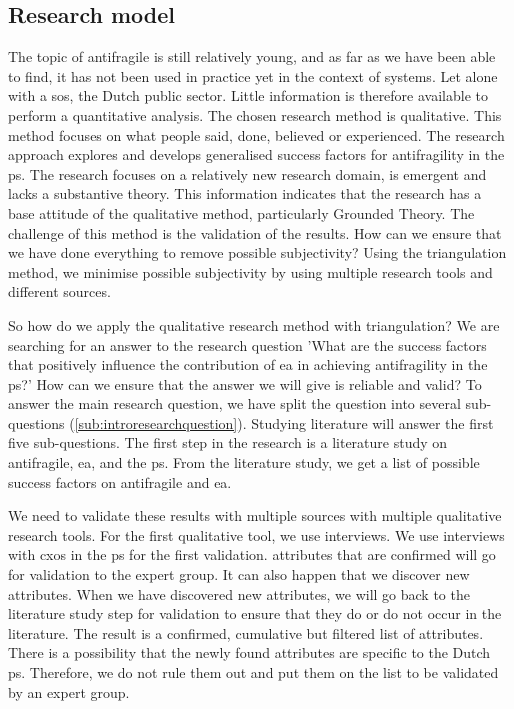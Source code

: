 \subsection{Research model}
\label{sec:researchmodel}
The topic of \gls{antifragile} is still relatively young, and as far as we have been able to find, it has not been used in practice yet in the context of systems. Let alone with a \gls{sos}, the Dutch public sector. Little information is therefore available to perform a quantitative analysis. The chosen research method is qualitative. This method focuses on what people said, done, believed or experienced. The research approach explores and develops generalised success factors for \gls{antifragility} in the \gls{ps}. The research focuses on a relatively new research domain, is emergent and lacks a substantive theory. This information indicates that the research has a base attitude of the qualitative method, particularly Grounded Theory. The challenge of this method is the validation of the results. How can we ensure that we have done everything to remove possible subjectivity? Using the triangulation method, we minimise possible subjectivity by using multiple research tools and different sources.

So how do we apply the qualitative research method with triangulation? We are searching for an answer to the research question 'What are the success factors that positively influence the contribution of \acrlong{ea} in achieving \gls{antifragility} in the \gls{ps}?' How can we ensure that the answer we will give is reliable and valid? To answer the main research question, we have split the question into several sub-questions (\cref{sub:introresearchquestion}). Studying literature will answer the first five sub-questions. The first step in the research is a literature study on \gls{antifragile}, \acrlong{ea}, and the \gls{ps}. From the literature study, we get a list of possible success factors on \gls{antifragile} and \acrlong{ea}.

We need to validate these results with multiple sources with multiple qualitative research tools. For the first qualitative tool, we use interviews. We use interviews with \glspl{cxo} in the \gls{ps} for the first validation. \Glspl{attribute} that are confirmed will go for validation to the expert group. It can also happen that we discover new \glspl{attribute}. When we have discovered new \glspl{attribute}, we will go back to the literature study step for validation to ensure that they do or do not occur in the literature. The result is a confirmed, cumulative but filtered list of \glspl{attribute}. There is a possibility that the newly found \glspl{attribute} are specific to the Dutch \gls{ps}. Therefore, we do not rule them out and put them on the list to be validated by an expert group.

